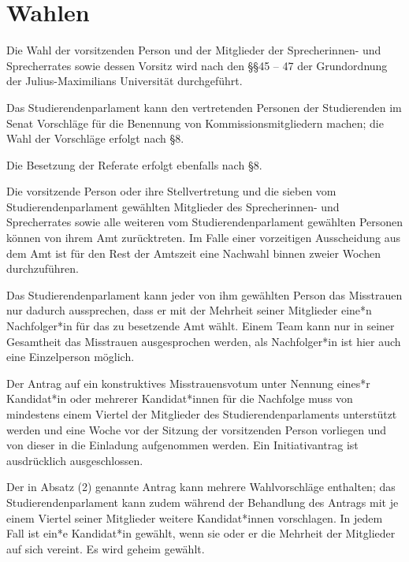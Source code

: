 \documentclass[10pt,a4paper]{scrartcl}
\begin{document}
\section{Wahlen}\label{wahlen}

\begin{contract}


\label{allgemeines}

Die Wahl der vorsitzenden Person und der Mitglieder der Sprecherinnen- und
Sprecherrates sowie dessen Vorsitz wird nach den §§45 -- 47 der Grundordnung der
Julius-Maximilians Universität durchgeführt.

Das Studierendenparlament kann den vertretenden Personen der Studierenden im
Senat Vorschläge für die Benennung von Kommissionsmitgliedern machen; die Wahl
der Vorschläge erfolgt nach §8.

Die Besetzung der Referate erfolgt ebenfalls nach §8.


\label{ruxfccktritt-von-neuwahl}

Die vorsitzende Person oder ihre Stellvertretung und die sieben vom
Studierendenparlament gewählten Mitglieder des Sprecherinnen- und
Sprecherrates sowie alle weiteren vom Studierendenparlament gewählten
Personen können von ihrem Amt zurücktreten. Im Falle einer vorzeitigen
Ausscheidung aus dem Amt ist für den Rest der Amtszeit eine Nachwahl
binnen zweier Wochen durchzuführen.


\label{konstruktives-misstrauensvotum}

  Das Studierendenparlament kann jeder von ihm gewählten Person das
  Misstrauen nur dadurch aussprechen, dass er mit der Mehrheit seiner
  Mitglieder eine*n Nachfolger*in für das zu besetzende Amt wählt. Einem
  Team kann nur in seiner Gesamtheit das Misstrauen ausgesprochen
  werden, als Nachfolger*in ist hier auch eine Einzelperson möglich.
  
	Der Antrag auf ein konstruktives Misstrauensvotum unter Nennung
  eines*r Kandidat*in oder mehrerer Kandidat*innen für die Nachfolge
  muss von mindestens einem Viertel der Mitglieder des Studierendenparlaments
	unterstützt werden und eine Woche vor der Sitzung der
  vorsitzenden Person vorliegen und von dieser in die Einladung
  aufgenommen werden. Ein Initiativantrag ist ausdrücklich
  ausgeschlossen.
     
	Der in Absatz (2) genannte Antrag kann mehrere Wahlvorschläge enthalten;
  das Studierendenparlament kann zudem während der Behandlung des Antrags
  mit je einem Viertel seiner Mitglieder weitere Kandidat*innen
  vorschlagen. In jedem Fall ist ein*e Kandidat*in gewählt, wenn sie
  oder er die Mehrheit der Mitglieder auf sich vereint. Es wird geheim
  gewählt.
     

\end{contract}
\end{document}
